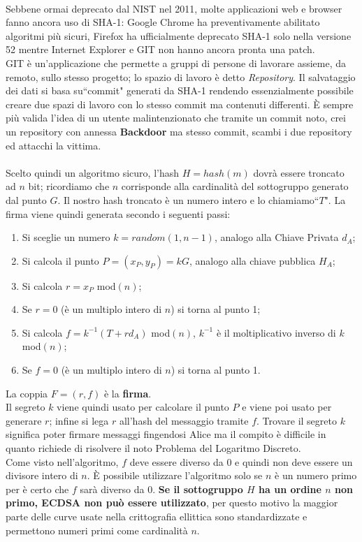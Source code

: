 \documentclass[a4paper,12pt]{tesiinfo}
\begin{document}
\\
Sebbene ormai deprecato dal NIST nel 2011, molte applicazioni web e browser fanno ancora uso di SHA-1: Google Chrome ha preventivamente abilitato algoritmi pi\`u sicuri, Firefox ha ufficialmente deprecato SHA-1 solo nella versione 52 mentre Internet Explorer e GIT non hanno ancora pronta una patch. \\
GIT \`e un'applicazione che permette a gruppi di persone di lavorare assieme, da remoto, sullo stesso progetto; lo spazio di lavoro \`e detto \textit{Repository}. Il salvataggio dei dati si basa su``commit" generati da SHA-1 rendendo essenzialmente possibile creare due spazi di lavoro con lo stesso commit ma contenuti differenti. \`E sempre pi\`u valida l'idea di un utente malintenzionato che tramite un commit noto, crei un repository con annessa \textbf{Backdoor} ma stesso commit, scambi i due repository ed attacchi la vittima.
\\
\\
Scelto quindi un algoritmo sicuro, l'hash $H = hash(m)$ dovr\`a essere troncato ad $n$ bit; ricordiamo che $n$ corrisponde alla cardinalit\`a del sottogruppo generato dal punto $G$. Il nostro hash troncato \`e un numero intero e lo chiamiamo``$T$". La firma viene quindi generata secondo i seguenti passi:
\begin{enumerate}
  \item Si sceglie un numero $k = random(1, n-1)$, analogo alla Chiave Privata $d_A$;
  \item Si calcola il punto $P = (x_P, y_P) = kG$, analogo alla chiave pubblica $H_A$;
  \item Si calcola $r = x_P $ mod$(n)$;
  \item Se $r = 0$ (\`e un multiplo intero di $n$) si torna al punto 1;
  \item Si calcola $f = k^{-1} (T+rd_A) $ mod$(n)$, $k^{-1}$ \`e il moltiplicativo inverso di $k$ mod$(n)$;
  \item Se $f = 0$ (\`e un multiplo intero di $n$) si torna al punto 1.
\end{enumerate}
La coppia $F = (r, f)$ \`e la \textbf{firma}.
\\
Il segreto $k$ viene quindi usato per calcolare il punto $P$ e viene poi usato per generare $r$; infine si lega $r$ all'hash del messaggio tramite $f$. Trovare il segreto $k$ significa poter firmare messaggi fingendosi Alice ma il compito \`e difficile in quanto richiede di risolvere il noto Problema del Logaritmo Discreto.
\\
Come visto nell'algoritmo, $f$ deve essere diverso da $0$ e quindi non deve essere un divisore intero di $n$. \`E possibile utilizzare l'algoritmo solo se $n$ \`e un numero primo per \`e certo che $f$ sar\`a diverso da $0$. \textbf{Se il sottogruppo $H$ ha un ordine $n$ non primo, ECDSA non pu\`o essere utilizzato}, per questo motivo la maggior parte delle curve usate nella crittografia ellittica sono standardizzate e permettono numeri primi come cardinalit\`a $n$.
\end{document}
